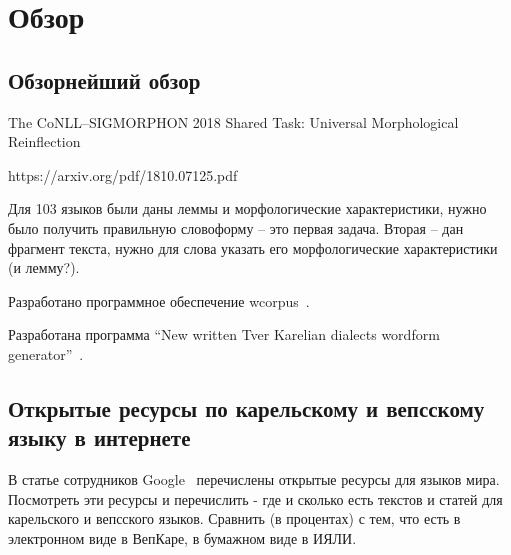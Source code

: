 \chapter{Обзор} \label{chapt_review}

\section{Обзорнейший обзор} \label{chapt_review_sect_intro}

The CoNLL--SIGMORPHON 2018   Shared Task: Universal Morphological Reinflection

https://arxiv.org/pdf/1810.07125.pdf

Для 103 языков были даны леммы и морфологические характеристики, 
нужно было получить правильную словоформу -- это первая задача. 
Вторая -- дан фрагмент текста, нужно для слова указать его морфологические 
характеристики (и лемму?).

Разработано программное обеспечение wcorpus~\cite{vakbib_soft_wcorpus}.

Разработана программа ``New written Tver Karelian dialects wordform generator''~\cite{vakbib_soft_Tver_generator}.




\section{Открытые ресурсы по карельскому и вепсскому языку в интернете} \label{sect_open_krl_vep_inet}

В статье сотрудников Google~\cite{Prasad2018} перечислены открытые ресурсы для языков мира. 
Посмотреть эти ресурсы и перечислить - где и сколько есть текстов и статей 
для карельского и вепсского языков. Сравнить (в процентах) с тем, что есть 
в электронном виде в ВепКаре, в бумажном виде в ИЯЛИ.




